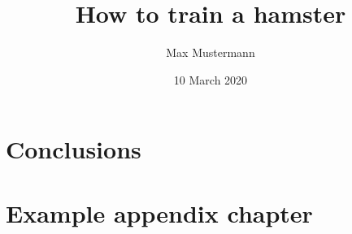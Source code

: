 \documentclass[ a4paper,
                oneside,
                toc=bibliography,
                toc=listof
                ]{scrbook}
\author{Max Mustermann}
\title{How to train a hamster}
\date{10 March 2020}
\begin{document}
    \frontmatter
    \makeIAStitle

    \cleardoublepage
    \tableofcontents
    \cleardoublepage
    \listoffigures
    \cleardoublepage
    \listoftables
     \cleardoublepage
    
    \cleardoublepage
    


    
    \acresetall
    \cleardoublepage


    \mainmatter

    
    
    

    \chapter{Conclusions}


    \cleardoublepage
    \printbibliography

    \appendix
    \chapter{Example appendix chapter}

    \declarationOfOriginality
\end{document}
